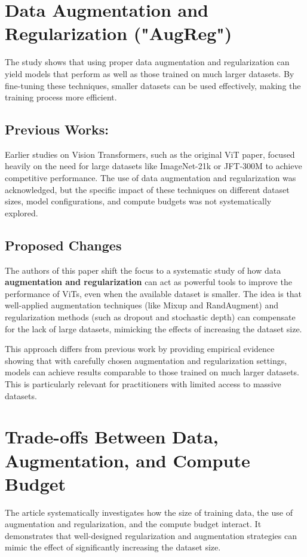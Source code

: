 \documentclass{report}
\begin{document}
	
	\section{Data Augmentation and Regularization ("AugReg")}
	The study shows that using proper data augmentation and regularization can yield models that perform as well as those trained on much larger datasets. By fine-tuning these techniques, smaller datasets can be used effectively, making the training process more efficient.
	
	\subsection{Previous Works:}
	Earlier studies on Vision Transformers, such as the original ViT paper, focused heavily on the need for large datasets like ImageNet-21k or JFT-300M to achieve competitive performance. The use of data augmentation and regularization was acknowledged, but the specific impact of these techniques on different dataset sizes, model configurations, and compute budgets was not systematically explored.
	
	\subsection{Proposed Changes}
	The authors of this paper shift the focus to a systematic study of how data \textbf{augmentation and regularization} can act as powerful tools to improve the performance of ViTs, even when the available dataset is smaller. The idea is that well-applied augmentation techniques (like Mixup and RandAugment) and regularization methods (such as dropout and stochastic depth) can compensate for the lack of large datasets, mimicking the effects of increasing the dataset size.
	
	
	This approach differs from previous work by providing empirical evidence showing that with carefully chosen augmentation and regularization settings, models can achieve results comparable to those trained on much larger datasets. This is particularly relevant for practitioners with limited access to massive datasets.
	
	
	
	
	
	
	\section{Trade-offs Between Data, Augmentation, and Compute Budget}
	 The article systematically investigates how the size of training data, the use of augmentation and regularization, and the compute budget interact. It demonstrates that well-designed regularization and augmentation strategies can mimic the effect of significantly increasing the dataset size.
	 
\end{document}
